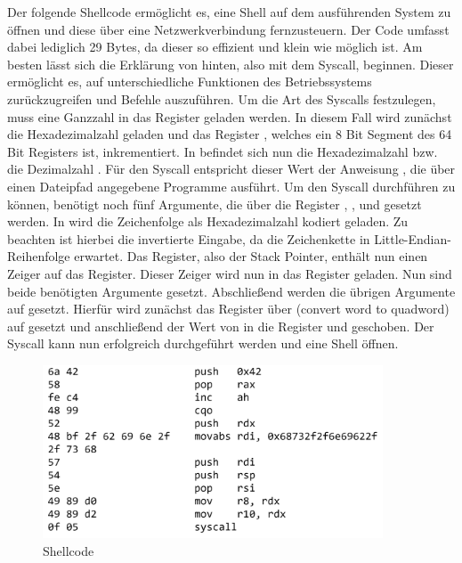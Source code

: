 Der folgende Shellcode ermöglicht es, eine Shell auf dem ausführenden System zu öffnen und diese über eine Netzwerkverbindung fernzusteuern. 
Der Code umfasst dabei lediglich 29 Bytes, da dieser so effizient und klein wie möglich ist. 
Am besten lässt sich die Erklärung von hinten, also mit dem Syscall, beginnen.
Dieser ermöglicht es, auf unterschiedliche Funktionen des Betriebssystems zurückzugreifen und Befehle auszuführen. 
Um die Art des Syscalls festzulegen, muss eine Ganzzahl in das Register  geladen werden. 
In diesem Fall wird zunächst die Hexadezimalzahl  geladen und das Register , 
welches ein 8 Bit Segment des 64 Bit  Registers ist, inkrementiert. 
In  befindet sich nun die Hexadezimalzahl  bzw. die Dezimalzahl . 
Für den Syscall entspricht dieser Wert der Anweisung , 
die über einen Dateipfad angegebene Programme ausführt. Um den Syscall durchführen zu können, benötigt  noch fünf Argumente, 
die über die Register , ,  und  gesetzt werden. 
In  wird die Zeichenfolge  als Hexadezimalzahl kodiert geladen. 
Zu beachten ist hierbei die invertierte Eingabe, da  die Zeichenkette in Little-Endian-Reihenfolge erwartet. Das  Register, 
also der Stack Pointer, 
enthält nun einen Zeiger auf das  Register. Dieser Zeiger wird nun in das  Register geladen. Nun sind beide benötigten Argumente gesetzt. 
Abschließend werden die übrigen Argumente auf  gesetzt. Hierfür wird zunächst das  Register 
über  (convert word to quadword) auf  gesetzt und
anschließend der Wert von  in die Register  und  geschoben. 
Der Syscall kann nun erfolgreich durchgeführt werden und eine Shell öffnen. \cite{syscalls} \cite{execman}

\begin{figure}[h]
    \centering
    \includegraphics[width=0.9\textwidth,height=0.75\textheight,keepaspectratio]{images/shellstorm.png}
    \caption{Shellcode}
\end{figure}
\cite{shellstorm}

